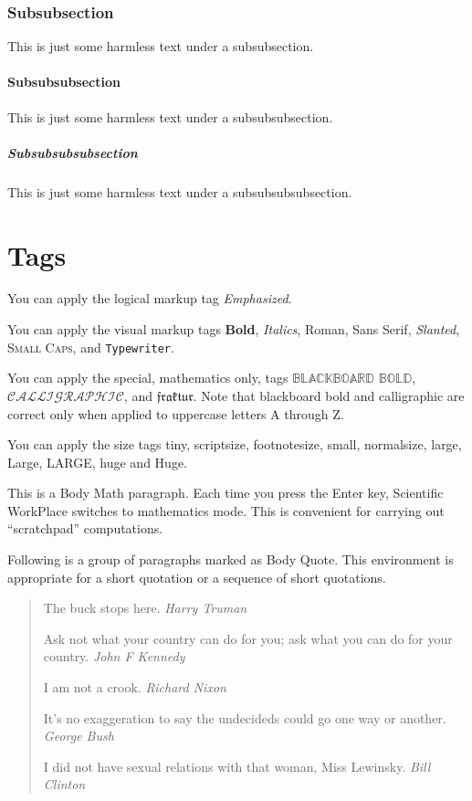 \documentclass[11pt,spanish]{report}
\begin{document}
\subsubsection{Subsubsection}

This is just some harmless text under a subsubsection.

\paragraph{Subsubsubsection}

This is just some harmless text under a subsubsubsection.

\subparagraph{Subsubsubsubsection}

This is just some harmless text under a subsubsubsubsection.

\section{Tags}

You can apply the logical markup tag \emph{Emphasized}.

You can apply the visual markup tags \textbf{Bold}, \textit{Italics},
\textrm{Roman}, \textsf{Sans Serif}, \textsl{Slanted}, \textsc{Small Caps},
and \texttt{Typewriter}.

You can apply the special, mathematics only, tags $\mathbb{BLACKBOARD}$
$\mathbb{BOLD}$, $\mathcal{CALLIGRAPHIC}$, and $\mathfrak{fraktur}$. Note that
blackboard bold and calligraphic are correct only when applied to uppercase
letters A through Z.

You can apply the size tags {\tiny tiny}, {\scriptsize scriptsize},
{\footnotesize footnotesize}, {\small small}, {\normalsize normalsize},
{\large large}, {\Large Large}, {\LARGE LARGE}, {\huge huge} and {\Huge Huge}.

This is a Body Math paragraph. Each time you press the Enter key, Scientific
WorkPlace switches to mathematics mode. This is convenient for carrying out
``scratchpad'' computations.

Following is a group of paragraphs marked as Body Quote. This environment is
appropriate for a short quotation or a sequence of short quotations.

\begin{quote}
The buck stops here. \emph{Harry Truman}

Ask not what your country can do for you; ask what you can do for your
country. \emph{John F Kennedy}

I am not a crook. \emph{Richard Nixon}

It's no exaggeration to say the undecideds could go one way or another.
\emph{George Bush}

I did not have sexual relations with that woman, Miss Lewinsky. \emph{Bill Clinton}
\end{quote}
\end{document}
